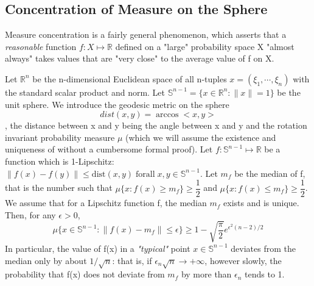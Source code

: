 \documentclass{article}
\theoremstyle{plain}
\begin{document}
\subsection{Concentration of Measure on the Sphere}
Measure concentration is a fairly general phenomenon, which asserts that a \textit{reasonable}
function $f: X \mapsto \mathbb{R}$ defined on a "large" probability space X "almost 
always" takes values that are "very close" to the average value of f on X.
\begin{example}
Let $\mathbb{R}^{n}$ be the n-dimensional Euclidean space of all n-tuples 
$x = (\xi_1, \cdots, \xi_n)$ with the standard scalar product and norm.
Let 
$\mathbb{S}^{n-1} = \lbrace x \in \mathbb{R}^{n} : \|x\| = 1 \rbrace $
be the unit sphere. We introduce the geodesic metric on the sphere 
$$dist(x,y) = \arccos <x, y>$$,
the distance between x and y being the angle between x and y and the rotation invariant
probability measure $\mu$ (which we will assume the existence and uniqueness of without a cumbersome
formal proof).
  Let $f: \mathbb{S}^{n-1} \mapsto \mathbb{R}$ be a function which is 1-Lipschitz:
  $\|f(x) - f(y)\| \leq \mathrm{dist}(x,y) \; \mathrm{for all} \; x,y \in \mathbb{S}^{n-1}$.
 Let $m_f$ be the median of f, that is the number such that
 $\mu\lbrace x: f(x) \geq m_{f} \rbrace \geq \dfrac{1}{2}$ and  $\mu\lbrace x: f(x) \leq m_{f} \rbrace \geq \dfrac{1}{2}$.
 We assume that for a Lipschitz function f, the median $m_f$ exists and is unique.
 Then, for any $\epsilon \gt 0$, 
$$\mu \lbrace x \in \mathbb{S}^{n-1} : \|f(x) - m_{f}\| \leq \epsilon \rbrace \geq 1 - \sqrt{\dfrac{\pi}{2}} e ^{\epsilon^{2} (n-2)/2}$$
In particular, the value of f(x) in a \textit{"typical"} point $x \in \mathbb{S}^{n-1}$ deviates from the median only by about
$1/{\sqrt{n}}$: that is, if $\epsilon_{n} \sqrt{n} \rightarrow +\infty$, however slowly, the probability that f(x) does not deviate from $m_f$ by more than $\epsilon_{n}$ tends to 1. 
\end{example}
\end{document}
